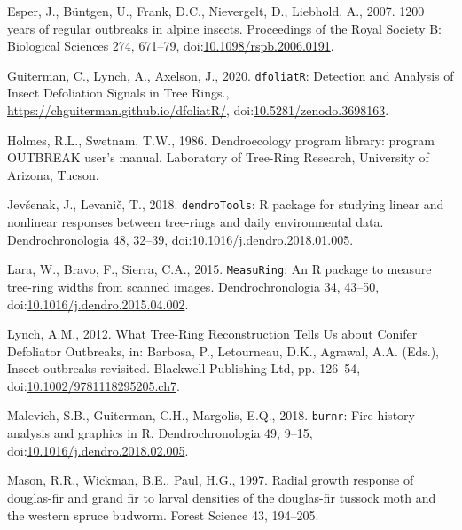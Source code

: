 \documentclass[review]{elsarticle} %
\begin{document}
\leavevmode\hypertarget{ref-Esper2007}{}%
Esper, J., Büntgen, U., Frank, D.C., Nievergelt, D., Liebhold, A., 2007. 1200 years of regular outbreaks in alpine insects. Proceedings of the Royal Society B: Biological Sciences 274, 671--79, doi:\href{https://doi.org/10.1098/rspb.2006.0191}{10.1098/rspb.2006.0191}.

\leavevmode\hypertarget{ref-dfoliatR}{}%
Guiterman, C., Lynch, A., Axelson, J., 2020. \texttt{dfoliatR}: Detection and Analysis of Insect Defoliation Signals in Tree Rings., \url{https://chguiterman.github.io/dfoliatR/}, doi:\href{https://doi.org/10.5281/zenodo.3698163}{10.5281/zenodo.3698163}.

\leavevmode\hypertarget{ref-outbreak}{}%
Holmes, R.L., Swetnam, T.W., 1986. Dendroecology program library: program OUTBREAK user's manual. Laboratory of Tree-Ring Research, University of Arizona, Tucson.

\leavevmode\hypertarget{ref-Jevsenak2018}{}%
Jevšenak, J., Levanič, T., 2018. \texttt{dendroTools}: R package for studying linear and nonlinear responses between tree-rings and daily environmental data. Dendrochronologia 48, 32--39, doi:\href{https://doi.org/10.1016/j.dendro.2018.01.005}{10.1016/j.dendro.2018.01.005}.

\leavevmode\hypertarget{ref-Lara2015}{}%
Lara, W., Bravo, F., Sierra, C.A., 2015. \texttt{MeasuRing}: An R package to measure tree-ring widths from scanned images. Dendrochronologia 34, 43--50, doi:\href{https://doi.org/10.1016/j.dendro.2015.04.002}{10.1016/j.dendro.2015.04.002}.

\leavevmode\hypertarget{ref-Lynch2012}{}%
Lynch, A.M., 2012. What Tree-Ring Reconstruction Tells Us about Conifer Defoliator Outbreaks, in: Barbosa, P., Letourneau, D.K., Agrawal, A.A. (Eds.), Insect outbreaks revisited. Blackwell Publishing Ltd, pp. 126--54, doi:\href{https://doi.org/10.1002/9781118295205.ch7}{10.1002/9781118295205.ch7}.

\leavevmode\hypertarget{ref-Malevich2018}{}%
Malevich, S.B., Guiterman, C.H., Margolis, E.Q., 2018. \texttt{burnr}: Fire history analysis and graphics in R. Dendrochronologia 49, 9--15, doi:\href{https://doi.org/10.1016/j.dendro.2018.02.005}{10.1016/j.dendro.2018.02.005}.

\leavevmode\hypertarget{ref-Mason1997}{}%
Mason, R.R., Wickman, B.E., Paul, H.G., 1997. Radial growth response of douglas-fir and grand fir to larval densities of the douglas-fir tussock moth and the western spruce budworm. Forest Science 43, 194--205.
\end{document}
